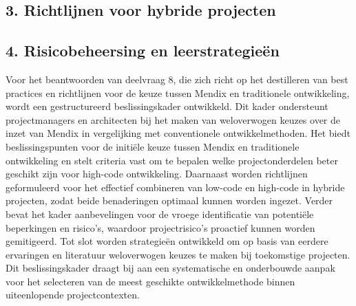 \subsection{3. Richtlijnen voor hybride projecten}

\subsection{4. Risicobeheersing en leerstrategieën}





Voor het beantwoorden van deelvraag 8, die zich richt op het destilleren van best practices en richtlijnen voor de keuze tussen Mendix en traditionele ontwikkeling, wordt een gestructureerd beslissingskader ontwikkeld. Dit kader ondersteunt projectmanagers en architecten bij het maken van weloverwogen keuzes over de inzet van Mendix in vergelijking met conventionele ontwikkelmethoden. Het biedt beslissingspunten voor de initiële keuze tussen Mendix en traditionele ontwikkeling en stelt criteria vast om te bepalen welke projectonderdelen beter geschikt zijn voor high-code ontwikkeling. Daarnaast worden richtlijnen geformuleerd voor het effectief combineren van low-code en high-code in hybride projecten, zodat beide benaderingen optimaal kunnen worden ingezet. Verder bevat het kader aanbevelingen voor de vroege identificatie van potentiële beperkingen en risico’s, waardoor projectrisico’s proactief kunnen worden gemitigeerd. Tot slot worden strategieën ontwikkeld om op basis van eerdere ervaringen en literatuur weloverwogen keuzes te maken bij toekomstige projecten. Dit beslissingskader draagt bij aan een systematische en onderbouwde aanpak voor het selecteren van de meest geschikte ontwikkelmethode binnen uiteenlopende projectcontexten.


